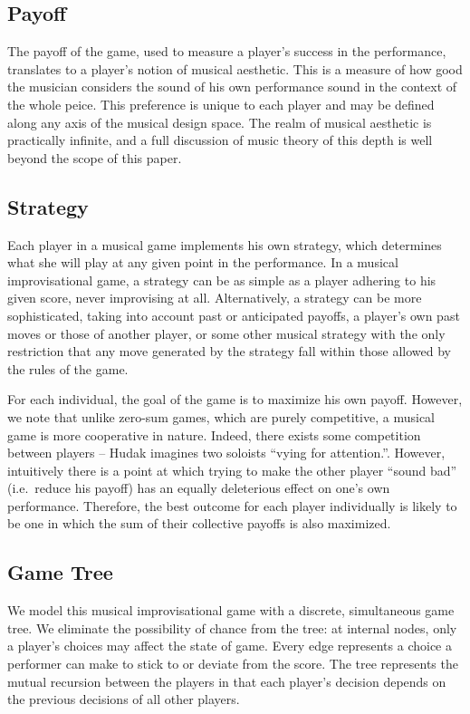 \documentclass{article}
\begin{document}
\subsection{Payoff}
The payoff of the game, used to measure a player's success in the
performance, translates to a player's notion of musical aesthetic. This
is a measure of how good the musician considers the sound of his own
performance sound in the context of the whole peice. This preference is
unique to each player and may be defined along any axis of the musical
design space. The realm of musical aesthetic is practically infinite,
and a full discussion of music theory of this depth is well beyond the
scope of this paper.

\subsection{Strategy}
Each player in a musical game implements his own strategy, which
determines what she will play at any given point in the performance. In
a musical improvisational game, a strategy can be as simple as a player
adhering to his given score, never improvising at all.
Alternatively, a strategy can be more sophisticated, taking into account
past or anticipated payoffs, a player's own past moves or those of
another player, or some other musical strategy with the only restriction
that any move generated by the strategy fall within those allowed by the
rules of the game.

For each individual, the goal of the game is to maximize his own
payoff. However, we note that unlike zero-sum games, which are purely
competitive, a musical game is more cooperative in nature. Indeed, there
exists some competition between players -- Hudak imagines two soloists
``vying for attention.''. However, intuitively there is a point at which
trying to make the other player ``sound bad'' (i.e.~reduce his payoff)
has an equally deleterious effect on one's own performance. Therefore,
the best outcome for each player individually is likely to be one in
which the sum of their collective payoffs is also maximized.

\subsection{Game Tree}
We model this musical improvisational game with a discrete, simultaneous
game tree. We eliminate the possibility of chance from the tree: at
internal nodes, only a player's choices may affect the state of game.
Every edge represents a choice a performer can make to stick to or
deviate from the score. The tree represents the mutual recursion between
the players in that each player's decision depends on the previous
decisions of all other players.
\end{document}
